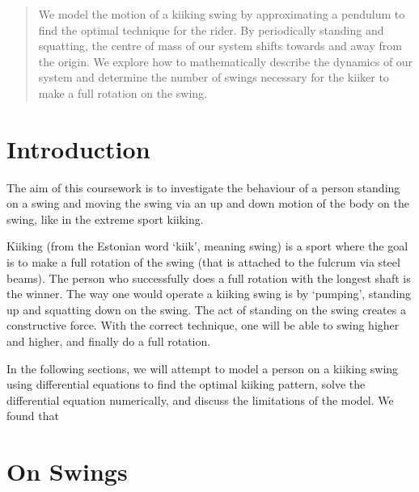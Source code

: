 \documentclass[12pt]{article}
\begin{document}
\begin{abstract}
    We model the motion of a kiiking swing by approximating a pendulum to find the optimal technique for the rider.  By periodically standing and squatting, the centre of mass of our system shifts towards and away from the origin.  We explore how to mathematically describe the dynamics of our system and determine the number of swings necessary for the kiiker to make a full rotation on the swing.
\end{abstract}

\section{Introduction}
The aim of this coursework is to investigate the behaviour of a person standing on a swing and moving the swing via an up and down motion of the body on the swing, like in the extreme sport kiiking.

Kiiking (from the Estonian word `kiik', meaning swing) is a sport where the goal is to make a full rotation of the swing (that is attached to the fulcrum via steel beams). The person who successfully does a full rotation with the longest shaft is the winner. The way one would operate a kiiking swing is by `pumping', standing up and squatting down on the swing. The act of standing on the swing creates a constructive force. With the correct technique, one will be able to swing higher and higher, and finally do a full rotation.

In the following sections, we will attempt to model a person on a kiiking swing using differential equations to find the optimal kiiking pattern, solve the differential equation numerically, and discuss the limitations of the model. We found that  %

\section{On Swings}


\end{document}
